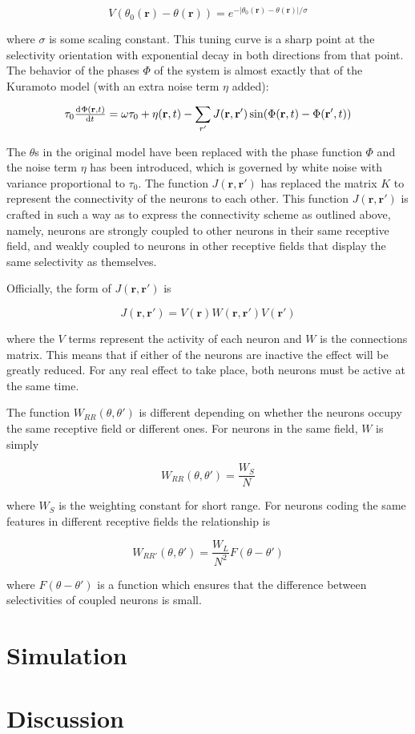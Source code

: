 \documentclass[12pt]{article}
\begin{document}
$$ V(\theta_0(\mathbf{r})-\theta(\mathbf{r}))=e^{-|\theta_0(\mathbf{r})-\theta(\mathbf{r})|/\sigma} $$

where $\sigma$ is some scaling constant.  This tuning curve is a sharp point at the selectivity orientation with exponential decay in both directions from that point.  The behavior of the phases $\Phi$ of the system is almost exactly that of the Kuramoto model (with an extra noise term $\eta$ added):

$$ \tau_0\od{\Phi(\mathbf{r},t)}{t}=\omega\tau_0+\eta(\mathbf{r},t)-\sum\limits_{r'}J(\mathbf{r},\mathbf{r}')\sin(\Phi(\mathbf{r},t)-\Phi(\mathbf{r'},t)) $$

The $\theta$s in the original model have been replaced with the phase function $\Phi$ and the noise term $\eta$ has been introduced, which is governed by white noise with variance proportional to $\tau_0$.  The function $J(\mathbf{r},\mathbf{r'})$ has replaced the matrix $K$ to represent the connectivity of the neurons to each other.  This function $J(\mathbf{r},\mathbf{r'})$ is crafted in such a way as to express the connectivity scheme as outlined above, namely, neurons are strongly coupled to other neurons in their same receptive field, and weakly coupled to neurons in other receptive fields that display the same selectivity as themselves.  

Officially, the form of $J(\mathbf{r},\mathbf{r'})$ is

$$ J(\mathbf{r},\mathbf{r'})=V(\mathbf{r})W(\mathbf{r},\mathbf{r'})V(\mathbf{r'}) $$

where the $V$ terms represent the activity of each neuron and $W$ is the connections matrix.  This means that if either of the neurons are inactive the effect will be greatly reduced.  For any real effect to take place, both neurons must be active at the same time.  

The function $W_{RR}(\theta,\theta')$ is different depending on whether the neurons occupy the same receptive field or different ones.  For neurons in the same field, $W$ is simply

$$ W_{RR}(\theta,\theta')=\frac{W_S}{N} $$

where $W_S$ is the weighting constant for short range.  For neurons coding the same features in different receptive fields the relationship is

$$ W_{RR'}(\theta,\theta')=\frac{W_L}{N^2}F(\theta-\theta') $$

where $F(\theta-\theta')$ is a function which ensures that the difference between selectivities of coupled neurons is small.  

\section{Simulation}



\section{Discussion}





\end{document}
